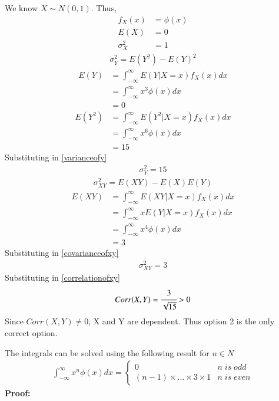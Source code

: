 \documentclass[journal,12pt,twocolumn]{IEEEtran}
\begin{document}
We know $X \sim N(0,1)$. Thus,
\begin{align}
    f_X(x) &= \phi(x)\\
    E(X) &= 0\\
    \sigma_X^2 &= 1
\end{align}
\begin{align}
    \sigma_Y^2 = E(Y^2) - E(Y)^2
    \label{varianceofy}
\end{align}
\begin{align}
    E(Y) &= \int_{-\infty}^{\infty}E(Y|X=x)f_X(x)dx\\
         &= \int_{-\infty}^{\infty}x^3\phi(x)dx\\
         &= 0
\end{align}
\begin{align}
    E(Y^2) &= \int_{-\infty}^{\infty}E(Y^2|X=x)f_X(x)dx\\
           &= \int_{-\infty}^{\infty}x^6\phi(x)dx\\
           &= 15
\end{align}
Substituting in \eqref{varianceofy}
\begin{align}
    \sigma_Y^2 = 15
\end{align}
\begin{align}
    \sigma_{XY}^2 = E(XY) - E(X)E(Y)
    \label{covarianceofxy}
\end{align}
\begin{align}
    E(XY) &= \int_{-\infty}^{\infty}E(XY|X=x)f_X(x)dx\\
          &= \int_{-\infty}^{\infty}xE(Y|X=x)f_X(x)dx\\
          &= \int_{-\infty}^{\infty}x^4\phi(x)dx\\
          &= 3
\end{align}
Substituting in \eqref{covarianceofxy}
\begin{align}
    \sigma_{XY}^2 = 3
\end{align}
Substituting in \eqref{correlationofxy}
\begin{align}
    Corr(X,Y) = \cfrac{3}{\sqrt{15}} > 0
\end{align}
Since $Corr(X,Y) \ne 0$, X and Y are dependent. Thus option 2 is the only correct option.

The integrals can be solved using the following result for $n \in N$
\begin{align}
    \int_{-\infty}^{\infty} x^n \phi(x)dx = 
    \begin{cases}
    0 & n\; is\; odd\\
    (n-1)\times...\times3\times1 & n\; is\; even
    \end{cases}
\end{align}
\textbf{Proof:}
\end{document}
